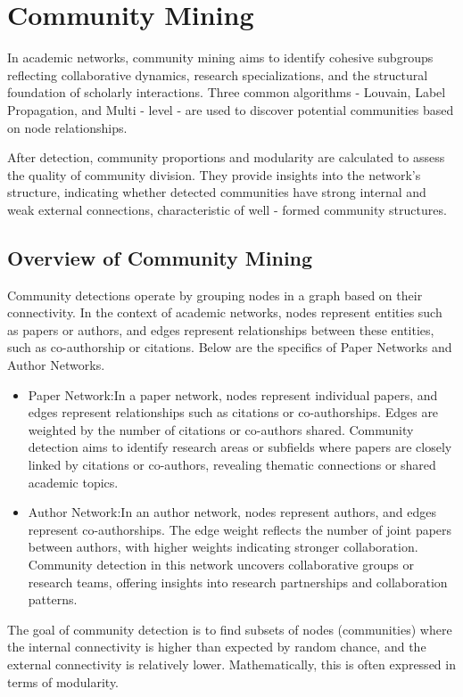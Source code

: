 \documentclass[11pt]{article}
\begin{document}
\section{Community Mining}
In academic networks, community mining aims to identify cohesive subgroups reflecting collaborative dynamics, research specializations, and the structural foundation of scholarly interactions. Three common algorithms - Louvain, Label Propagation, and Multi - level - are used to discover potential communities based on node relationships.

After detection, community proportions and modularity are calculated to assess the quality of community division. They provide insights into the network's structure, indicating whether detected communities have strong internal and weak external connections, characteristic of well - formed community structures.

\subsection{Overview of Community Mining}
Community detections operate by grouping nodes in a graph based on their connectivity. In the context of academic networks, nodes represent entities such as papers or authors, and edges represent relationships between these entities, such as co-authorship or citations. Below are the specifics of Paper Networks and Author Networks.
\begin{itemize}
	\item {Paper Network:}In a paper network, nodes represent individual papers, and edges represent relationships such as citations or co-authorships. Edges are weighted by the number of citations or co-authors shared. Community detection aims to identify research areas or subfields where papers are closely linked by citations or co-authors, revealing thematic connections or shared academic topics.
	\item {Author Network:}In an author network, nodes represent authors, and edges represent co-authorships. The edge weight reflects the number of joint papers between authors, with higher weights indicating stronger collaboration. Community detection in this network uncovers collaborative groups or research teams, offering insights into research partnerships and collaboration patterns.
\end{itemize}

The goal of community detection is to find subsets of nodes (communities) where the internal connectivity is higher than expected by random chance, and the external connectivity is relatively lower. Mathematically, this is often expressed in terms of modularity.
\end{document}
